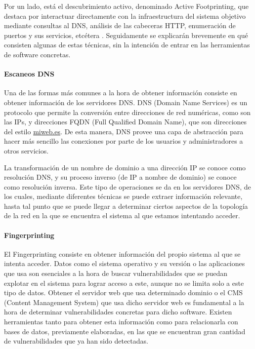 Por un lado, está el descubrimiento activo, denominado Active Footprinting, que destaca por interactuar directamente con la infraestructura del sistema objetivo mediante consultas al DNS, análisis de las cabeceras HTTP, enumeración de puertos y sus servicios, etcétera \cite{pentesting-kali}. Seguidamente se explicarán brevemente en qué consisten algunas de estas técnicas, sin la intención de entrar en las herramientas de software concretas.

\paragraph{Escaneos DNS}

Una de las formas más comunes a la hora de obtener información consiste en obtener información de los servidores DNS. DNS (Domain Name Services) es un protocolo que permite la conversión entre direcciones de red numéricas, como son las IPs, y direcciones FQDN (Full Qualified Domain Name), que son direcciones del estilo \url{miweb.es}. De esta manera, DNS provee una capa de abstracción para hacer más sencillo las conexiones por parte de los usuarios y administradores a otros servicios.

La transformación de un nombre de dominio a una dirección IP se conoce como resolución DNS, y su proceso inverso (de IP a nombre de dominio) se conoce como resolución inversa. Este tipo de operaciones se da en los servidores DNS, de los cuales, mediante diferentes técnicas se puede extraer información relevante, hasta tal punto que se puede llegar a determinar ciertos aspectos de la topología de la red en la que se encuentra el sistema al que estamos intentando acceder.

\paragraph{Fingerprinting}

El Fingerprinting consiste en obtener información del propio sistema al que se intenta acceder. Datos como el sistema operativo y su versión o las aplicaciones que usa son esenciales a la hora de buscar vulnerabilidades que se puedan explotar en el sistema para lograr acceso a este, aunque no se limita solo a este tipo de datos. Obtener el servidor web que usa determinado dominio o el CMS (Content Management System) que usa dicho servidor web es fundamental a la hora de determinar vulnerabilidades concretas para dicho software. Existen herramientas tanto para obtener esta información como para relacionarla con bases de datos, previamente elaboradas, en las que se encuentran gran cantidad de vulnerabilidades que ya han sido detectadas.

